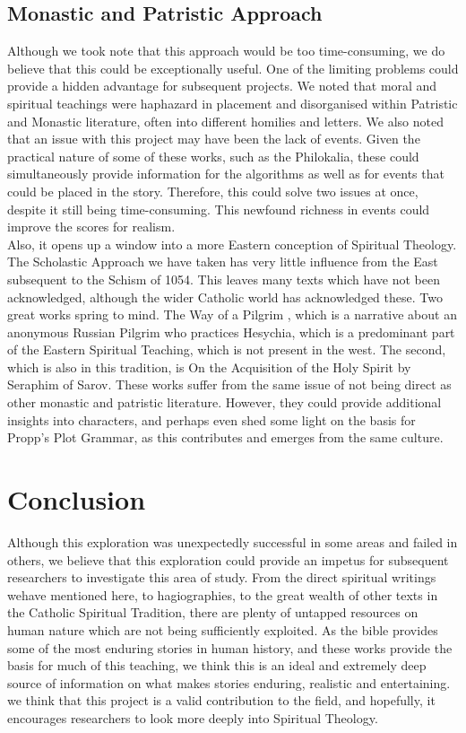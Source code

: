 \documentclass[11pt]{article}
\begin{document}
\subsection{Monastic and Patristic Approach}
Although we took note that this approach would be too time-consuming, we do believe that this could be exceptionally useful. One of the limiting problems could provide a hidden advantage for subsequent projects. We noted that moral and spiritual teachings were haphazard in placement and disorganised within Patristic and Monastic literature, often into different homilies and letters. We also noted that an issue with this project may have been the lack of events. Given the practical nature of some of these works, such as the Philokalia, these could simultaneously provide information for the algorithms as well as for events that could be placed in the story. Therefore, this could solve two issues at once, despite it still being time-consuming. This newfound richness in events could improve the scores for realism.\\

Also, it opens up a window into a more Eastern conception of Spiritual Theology. The Scholastic Approach we have taken has very little influence from the East subsequent to the Schism of 1054. This leaves many texts which have not been acknowledged, although the wider Catholic world has acknowledged these. Two great works spring to mind. The Way of a Pilgrim \cite{helen1992way}, which is a narrative about an anonymous Russian Pilgrim who practices Hesychia, which is a predominant part of the Eastern Spiritual Teaching, which is not present in the west. The second, which is also in this tradition, is On the Acquisition of the Holy Spirit by Seraphim of Sarov\cite{sarov2015acquisition}. These works suffer from the same issue of not being direct as other monastic and patristic literature. However, they could provide additional insights into characters, and perhaps even shed some light on the basis for Propp's Plot Grammar, as this contributes and emerges from the same culture. 

\section{Conclusion}
Although this exploration was unexpectedly successful in some areas and failed in others, we believe that this exploration could provide an impetus for subsequent researchers to investigate this area of study. From the direct spiritual writings wehave mentioned here, to hagiographies, to the great wealth of other texts in the Catholic Spiritual Tradition, there are plenty of untapped resources on human nature which are not being sufficiently exploited. As the bible provides some of the most enduring stories in human history, and these works provide the basis for much of this teaching, we think this is an ideal and extremely deep source of information on what makes stories enduring, realistic and entertaining. we think that this project is a valid contribution to the field, and hopefully, it encourages researchers to look more deeply into Spiritual Theology.
\end{document}
